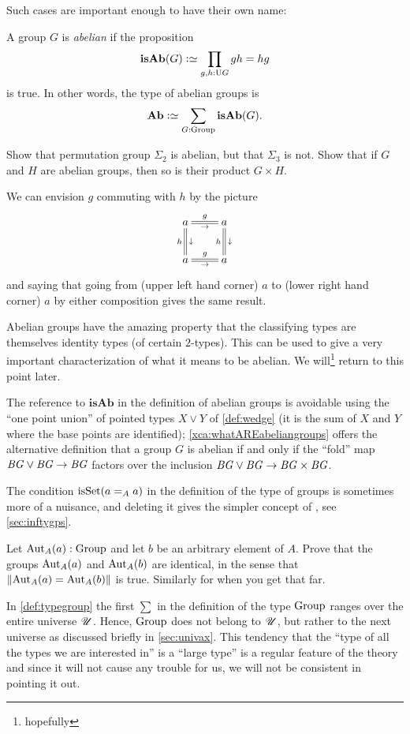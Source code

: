  Such cases are important enough to have their own name:
\begin{definition}\label{def:abgp}
  A group $G$ is \emph{abelian} if %
the proposition
$$\mathbf{isAb}(G)\defequi\prod_{g,h: \USym G}gh=hg$$
is true.  In other words, the type of abelian groups is 
$$\mathbf{Ab}\defequi \sum_{G:\typegroup}\mathbf{isAb}(G).$$
\end{definition}
\begin{xca}\label{exer:first examples}
  Show that permutation group $\Sigma_2$ is abelian, but that $\Sigma_3$ is not.  Show that if $G$ and $H$ are abelian groups, then so is their product $G\times H$.
\end{xca}
We can envision $g$ commuting with $h$ by the picture
$$\xymatrix{a\ar@{=}[r]^g_\to\ar@{=}[d]^\downarrow_h&a\ar@{=}[d]^\downarrow_h\\
a\ar@{=}[r]^g_\to&a}$$
and saying that going from (upper left hand corner) $a$ to (lower right hand corner) $a$ by either composition gives the same result.

Abelian groups have the amazing property that the classifying types are themselves identity types (of certain $2$-types).  This can be used to give a very important characterization of what it means to be abelian.  We will\footnote{hopefully} return to this point later.
\begin{remark}
  \label{rem:whatAREabeliangroups}
  The reference to $\mathbf{isAb}$ in the definition of abelian groups is avoidable using the ``one point union'' of pointed types $X\vee Y$ of \cref{def:wedge} (it is the sum of $X$ and $Y$ where the base points are identified); \cref{xca:whatAREabeliangroups} offers the alternative definition that a group $G$ is abelian if and only if the ``fold'' map $\mathit{B}\mathit{G}\vee \mathit{B}\mathit{G}\to \mathit{B}\mathit{G}$ factors over the inclusion $\mathit{B}\mathit{G}\vee\mathit{B}\mathit{G}\to\mathit{B}\mathit{G}\times\mathit{B}\mathit{G}$.
\end{remark}
\begin{remark}
  The condition $\isset(a=_Aa)$ in the definition of the type of groups is sometimes more of a nuisance, and deleting it gives the simpler concept of \aninftygp, see \cref{sec:inftygps}.
\end{remark}
\begin{xca}
   Let $\aut_A(a):\typegroup$ and let $b$ be an arbitrary element of $A$.  Prove that the groups $\aut_A(a)$ and $\aut_A(b)$ are identical, in the sense that $\Trunc{\aut_A(a)=\aut_A(b)}$ is true.  Similarly for \inftygps when you get that far.
\end{xca}
\begin{remark}\label{rem:monoidandabsgplarge}
 In \cref{def:typegroup} the first $\sum$ in the definition of the type $\mathrm{Group}$ ranges over the entire universe ${\mathscr{U}}$.  Hence, $\mathrm{Group}$ does not belong to ${\mathscr{U}}$, but rather to the next universe as discussed briefly in \cref{sec:univax}.   This tendency that the ``type of all the types we are interested in'' is a ``large type'' is a regular feature of the theory and since it will not cause any trouble for us, we will not be consistent in pointing it out.
  \end{remark}

